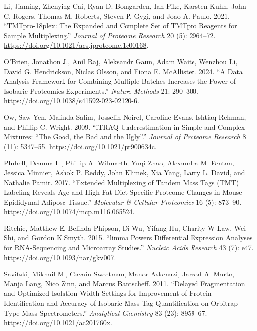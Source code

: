 \documentclass[
  letterpaper,
  DIV=11,
  numbers=noendperiod]{scrartcl}
\newlength{\cslhangindent}
\newenvironment{CSLReferences}[2] %
 {\begin{list}{}{%
  \setlength{\itemindent}{0pt}
  \setlength{\leftmargin}{0pt}
  \setlength{\parsep}{0pt}
  \ifodd #1
   \setlength{\leftmargin}{\cslhangindent}
   \setlength{\itemindent}{-1\cslhangindent}
  \fi
  \setlength{\itemsep}{#2\baselineskip}}}
 {\end{list}}
\begin{document}
\begin{CSLReferences}{1}{0}
Li, Jiaming, Zhenying Cai, Ryan D. Bomgarden, Ian Pike, Karsten Kuhn,
John C. Rogers, Thomas M. Roberts, Steven P. Gygi, and Joao A. Paulo.
2021. {``{TMTpro}-18plex: The Expanded and Complete Set of {TMTpro}
Reagents for Sample Multiplexing.''} \emph{Journal of Proteome Research}
20 (5): 2964--72. \url{https://doi.org/10.1021/acs.jproteome.1c00168}.

O'Brien, Jonathon J., Anil Raj, Aleksandr Gaun, Adam Waite, Wenzhou Li,
David G. Hendrickson, Niclas Olsson, and Fiona E. McAllister. 2024. {``A
Data Analysis Framework for Combining Multiple Batches Increases the
Power of Isobaric Proteomics Experiments.''} \emph{Nature Methods} 21:
290--300. \url{https://doi.org/10.1038/s41592-023-02120-6}.

Ow, Saw Yen, Malinda Salim, Josselin Noirel, Caroline Evans, Ishtiaq
Rehman, and Phillip C. Wright. 2009. {``{iTRAQ} Underestimation in
Simple and Complex Mixtures: {``}The Good, the Bad and the Ugly{''}.''}
\emph{Journal of Proteome Research} 8 (11): 5347--55.
\url{https://doi.org/10.1021/pr900634c}.

Plubell, Deanna L., Phillip A. Wilmarth, Yuqi Zhao, Alexandra M. Fenton,
Jessica Minnier, Ashok P. Reddy, John Klimek, Xia Yang, Larry L. David,
and Nathalie Pamir. 2017. {``Extended Multiplexing of Tandem Mass Tags
({TMT}) Labeling Reveals Age and High Fat Diet Specific Proteome Changes
in Mouse Epididymal Adipose Tissue.''} \emph{Molecular \& Cellular
Proteomics} 16 (5): 873--90.
\url{https://doi.org/10.1074/mcp.m116.065524}.

Ritchie, Matthew E, Belinda Phipson, Di Wu, Yifang Hu, Charity W Law,
Wei Shi, and Gordon K Smyth. 2015. {``{limma} Powers Differential
Expression Analyses for {RNA}-Sequencing and Microarray Studies.''}
\emph{Nucleic Acids Research} 43 (7): e47.
\url{https://doi.org/10.1093/nar/gkv007}.

Savitski, Mikhail M., Gavain Sweetman, Manor Askenazi, Jarrod A. Marto,
Manja Lang, Nico Zinn, and Marcus Bantscheff. 2011. {``Delayed
Fragmentation and Optimized Isolation Width Settings for Improvement of
Protein Identification and Accuracy of Isobaric Mass Tag Quantification
on Orbitrap-Type Mass Spectrometers.''} \emph{Analytical Chemistry} 83
(23): 8959--67. \url{https://doi.org/10.1021/ac201760x}.


\end{CSLReferences}
\end{document}
